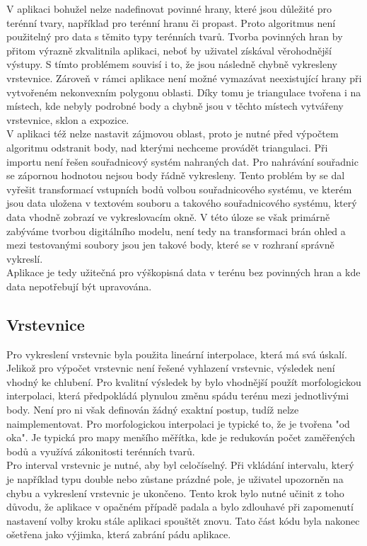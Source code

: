 \documentclass[a4paper, 12pt]{article}
\begin{document}
V aplikaci bohužel nelze nadefinovat povinné hrany, které jsou důležité pro terénní tvary, například pro terénní hranu či propast. Proto algoritmus není použitelný pro data s těmito typy terénních tvarů. Tvorba povinných hran by přitom výrazně zkvalitnila aplikaci, neboť by uživatel získával věrohodnější výstupy. S tímto problémem souvisí i to, že jsou následně chybně vykresleny vrstevnice. Zároveň v rámci aplikace není možné vymazávat neexistující hrany při vytvořeném nekonvexním polygonu oblasti. Díky tomu je triangulace tvořena i na místech, kde nebyly podrobné body a chybně jsou v těchto místech vytvářeny vrstevnice, sklon a expozice. \\

V aplikaci též nelze nastavit zájmovou oblast, proto je nutné před výpočtem algoritmu odstranit body, nad kterými nechceme provádět triangulaci. Při importu není řešen souřadnicový systém nahraných dat. Pro nahrávání souřadnic se zápornou hodnotou nejsou body řádně vykresleny. Tento problém by se dal vyřešit transformací vstupních bodů volbou souřadnicového systému, ve kterém jsou data uložena v textovém souboru a takového souřadnicového systému, který data vhodně zobrazí ve vykreslovacím okně. V této úloze se však primárně zabýváme tvorbou digitálního modelu, není tedy na transformaci brán ohled a mezi testovanými soubory jsou jen takové body, které se v rozhraní správně vykreslí. \\

Aplikace je tedy užitečná pro výškopisná data v terénu bez povinných hran a kde data nepotřebují být upravována.\\

\subsection{Vrstevnice}
Pro vykreslení vrstevnic byla použita lineární interpolace, která má svá úskalí. Jelikož pro výpočet vrstevnic není řešené vyhlazení vrstevnic, výsledek není vhodný ke chlubení. Pro kvalitní výsledek by bylo vhodnější použít morfologickou interpolaci, která předpokládá plynulou změnu spádu terénu mezi jednotlivými body. Není pro ni však definován žádný exaktní postup, tudíž nelze naimplementovat. Pro morfologickou interpolaci je typické to, že je tvořena "od oka". Je typická pro mapy menšího měřítka, kde je redukován počet zaměřených bodů a využívá zákonitosti terénních tvarů. \\

Pro interval vrstevnic je nutné, aby byl celočíselný. Při vkládání intervalu, který je například typu double nebo zůstane prázdné pole, je uživatel upozorněn na chybu a vykreslení vrstevnic je ukončeno. Tento krok bylo nutné učinit z toho důvodu, že aplikace v opačném případě padala a bylo zdlouhavé při zapomenutí nastavení volby kroku stále aplikaci spouštět znovu. Tato část kódu byla nakonec ošetřena jako výjimka, která zabrání pádu aplikace. \\
\end{document}
